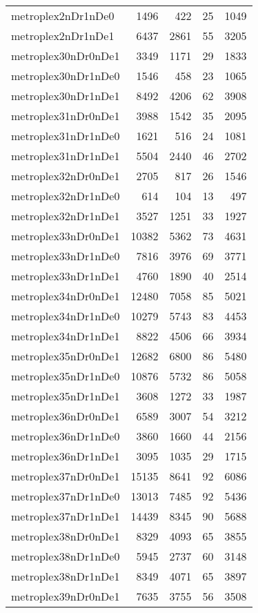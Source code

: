 \begin{longtable}{lrrrr}
metroplex2nDr1nDe0 & 1496 & 422 & 25 & 1049 \\
metroplex2nDr1nDe1 & 6437 & 2861 & 55 & 3205 \\
metroplex30nDr0nDe1 & 3349 & 1171 & 29 & 1833 \\
metroplex30nDr1nDe0 & 1546 & 458 & 23 & 1065 \\
metroplex30nDr1nDe1 & 8492 & 4206 & 62 & 3908 \\
metroplex31nDr0nDe1 & 3988 & 1542 & 35 & 2095 \\
metroplex31nDr1nDe0 & 1621 & 516 & 24 & 1081 \\
metroplex31nDr1nDe1 & 5504 & 2440 & 46 & 2702 \\
metroplex32nDr0nDe1 & 2705 & 817 & 26 & 1546 \\
metroplex32nDr1nDe0 & 614 & 104 & 13 & 497 \\
metroplex32nDr1nDe1 & 3527 & 1251 & 33 & 1927 \\
metroplex33nDr0nDe1 & 10382 & 5362 & 73 & 4631 \\
metroplex33nDr1nDe0 & 7816 & 3976 & 69 & 3771 \\
metroplex33nDr1nDe1 & 4760 & 1890 & 40 & 2514 \\
metroplex34nDr0nDe1 & 12480 & 7058 & 85 & 5021 \\
metroplex34nDr1nDe0 & 10279 & 5743 & 83 & 4453 \\
metroplex34nDr1nDe1 & 8822 & 4506 & 66 & 3934 \\
metroplex35nDr0nDe1 & 12682 & 6800 & 86 & 5480 \\
metroplex35nDr1nDe0 & 10876 & 5732 & 86 & 5058 \\
metroplex35nDr1nDe1 & 3608 & 1272 & 33 & 1987 \\
metroplex36nDr0nDe1 & 6589 & 3007 & 54 & 3212 \\
metroplex36nDr1nDe0 & 3860 & 1660 & 44 & 2156 \\
metroplex36nDr1nDe1 & 3095 & 1035 & 29 & 1715 \\
metroplex37nDr0nDe1 & 15135 & 8641 & 92 & 6086 \\
metroplex37nDr1nDe0 & 13013 & 7485 & 92 & 5436 \\
metroplex37nDr1nDe1 & 14439 & 8345 & 90 & 5688 \\
metroplex38nDr0nDe1 & 8329 & 4093 & 65 & 3855 \\
metroplex38nDr1nDe0 & 5945 & 2737 & 60 & 3148 \\
metroplex38nDr1nDe1 & 8349 & 4071 & 65 & 3897 \\
metroplex39nDr0nDe1 & 7635 & 3755 & 56 & 3508 \\

\end{longtable}
